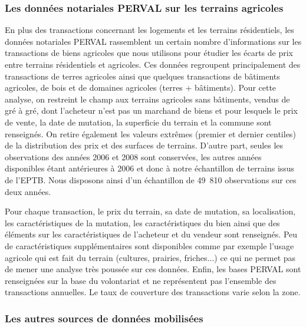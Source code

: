 \documentclass[10.5pt,a4paper]{article}
\begin{document}
{{


\subsubsection{Les données notariales PERVAL sur les terrains agricoles}

En plus des transactions concernant les logements et les terrains résidentiels, les données notariales PERVAL rassemblent un certain nombre d’informations sur les transactions de biens agricoles que nous utilisons pour étudier les écarts de prix entre terrains résidentiels et agricoles. Ces données regroupent principalement des transactions de terres agricoles ainsi que quelques transactions de bâtiments agricoles, de bois et de domaines agricoles (terres + bâtiments). Pour cette analyse, on restreint le champ aux terrains agricoles sans bâtiments, vendus de gré à gré, dont l'acheteur n'est pas un marchand de biens et pour lesquels le prix de vente, la date de mutation, la superficie du terrain et la commune sont renseignés. On retire également les valeurs extrêmes (premier et dernier centiles) de la distribution des prix et des surfaces de terrains. D'autre part, seules les observations des années 2006 et 2008 sont conservées, les autres années disponibles étant antérieures à 2006 et donc à notre échantillon de terrains issus de l'EPTB. Nous disposons ainsi d'un échantillon de 49~810 observations sur ces deux années. \par

Pour chaque transaction, le prix du terrain, sa date de mutation, sa localisation, les caractéristiques de la mutation, les caractéristiques du bien ainsi que des éléments sur les caractéristiques de l’acheteur et du vendeur sont renseignés. Peu de caractéristiques supplémentaires sont disponibles comme par exemple l'usage agricole qui est fait du terrain (cultures, prairies, friches...) ce qui ne permet pas de mener une analyse très poussée sur ces données.  Enfin, les bases PERVAL sont renseignées sur la base du volontariat et ne représentent pas l’ensemble des transactions annuelles. Le taux de couverture des transactions varie selon la zone. \par

\subsubsection{Les autres sources de donn\'ees mobilis\'ees}


}

}
\end{document}

